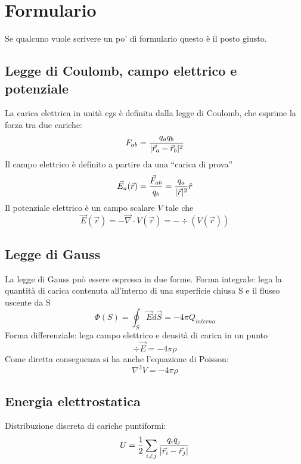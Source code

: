\documentclass[../main.tex]{subfiles}
\begin{document}
\section{Formulario}
\setcounter{equation}{0}
\renewcommand{\theequation}{F.\arabic{equation}}

Se qualcuno vuole scrivere un po' di formulario questo è il posto giusto.

\subsection{Legge di Coulomb, campo elettrico e potenziale}\label{Preliminari}
La carica elettrica in unit\`a cgs \`e definita dalla legge di Coulomb, che esprime la forza tra due cariche:
\begin{equation}
	\label{Coulomb}
	F_{ab}=\frac{q_aq_b}{\lvert\vec r_a -\vec r_b\rvert^2}
\end{equation}
Il campo elettrico \`e definito a partire da una ``carica di prova''
\begin{equation}
	\label{CampoElettrico}
	\vec E_{a}(\vec r)=\frac{\vec F_{ab}}{q_b}=\frac{q_a}{\lvert\vec r\rvert^2}\hat r
\end{equation}
Il potenziale elettrico \`e un campo scalare $V$ tale che
\begin{equation}
	\label{Potenziale}
	\vec E(\vec r) = - \vec \nabla \cdot V(\vec r) = - \div (V(\vec r))
\end{equation}

\subsection{Legge di Gauss}\label{Gauss}
La legge di Gauss pu\`o essere espressa in due forme.\newline
Forma integrale: lega la quantit\`a di carica contenuta all'interno di una superficie chiusa S e il flusso uscente da S
\begin{equation}
	\label{GaussIntegrale}
	\Phi(S)= \oint_S \vec E d\vec S=-4\pi Q_{interna}
\end{equation}
Forma differenziale: lega campo elettrico e densit\`a di carica in un punto 
\begin{equation}
	\label{GaussDifferenziale}
	\div \vec E=-4\pi\rho
\end{equation}
Come diretta conseguenza si ha anche l'equazione di Poisson:
\begin{equation}
	\label{Poisson}
	\nabla^2V= -4\pi \rho
\end{equation}

\subsection{Energia elettrostatica}\label{EnergiaElettrostatica}
Distribuzione discreta di cariche puntiformi:
\begin{equation}
	\label{EEDiscreta}
	U= \frac{1}{2} \sum_{i\neq j} \frac{q_iq_j}{\lvert\vec r_i -\vec r_j\rvert}
\end{equation}
\end{document}
